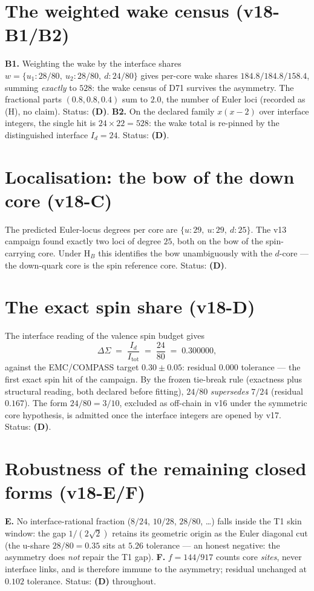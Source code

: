\documentclass[11pt,a4paper]{article}
\newcommand{\Itot}{I_{\mathrm{tot}}}
\begin{document}
\section{The weighted wake census (v18-B1/B2)}
\textbf{B1.} Weighting the wake by the interface shares $w = \{u_1: 28/80,\ u_2: 28/80,\ d: 24/80\}$ gives per-core wake shares $184.8 / 184.8 / 158.4$, summing \emph{exactly} to $528$: the wake census of D71 survives the asymmetry. The fractional parts $(0.8, 0.8, 0.4)$ sum to $2.0$, the number of Euler loci (recorded as (H), no claim). Status: \textbf{(D)}.
\textbf{B2.} On the declared family $x(x-2)$ over interface integers, the single hit is $24 \times 22 = 528$: the wake total is re-pinned by the distinguished interface $I_d = 24$. Status: \textbf{(D)}.

\section{Localisation: the bow of the down core (v18-C)}
The predicted Euler-locus degrees per core are $\{u: 29,\ u: 29,\ d: 25\}$. The v13 campaign found exactly two loci of degree $25$, both on the bow of the spin-carrying core. Under H$_B$ this identifies the bow unambiguously with the $d$-core --- the down-quark core is the spin reference core. Status: \textbf{(D)}.

\section{The exact spin share (v18-D)}
The interface reading of the valence spin budget gives
\[
\Delta\Sigma \;=\; \frac{I_d}{\Itot} \;=\; \frac{24}{80} \;=\; 0.300000,
\]
against the EMC/COMPASS target $0.30 \pm 0.05$: residual $0.000$ tolerance --- the first exact spin hit of the campaign. By the frozen tie-break rule (exactness plus structural reading, both declared before fitting), $24/80$ \emph{supersedes} $7/24$ (residual $0.167$). The form $24/80 = 3/10$, excluded as off-chain in v16 under the symmetric core hypothesis, is admitted once the interface integers are opened by v17. Status: \textbf{(D)}.

\section{Robustness of the remaining closed forms (v18-E/F)}
\textbf{E.} No interface-rational fraction ($8/24$, $10/28$, $28/80$, \dots) falls inside the T1 skin window: the gap $1/(2\sqrt{2})$ retains its geometric origin as the Euler diagonal cut (the u-share $28/80 = 0.35$ sits at $5.26$ tolerance --- an honest negative: the asymmetry does \emph{not} repair the T1 gap). \textbf{F.} $f = 144/917$ counts core \emph{sites}, never interface links, and is therefore immune to the asymmetry; residual unchanged at $0.102$ tolerance. Status: \textbf{(D)} throughout.
\end{document}
